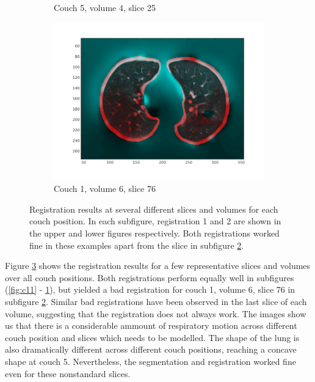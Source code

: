 \documentclass[11pt,a4paper,oneside]{report}
\begin{document}
\begin{figure}
\begin{subfigure}[b]{0.3\textwidth}
	  \caption{Couch 5, volume 4, slice 25}
	  \label{fig:c22}
  \end{subfigure}
  \begin{subfigure}[b]{0.3\textwidth}
	  \includegraphics[width=\textwidth, trim=20 20 20 20]{figures/reg2/reg1_6_76.png}
	  \caption{Couch 1, volume 6, slice 76}
	  \label{fig:c23}
  \end{subfigure}
  \caption{Registration results at several different slices and volumes for each couch position. In each subfigure, registration 1 and 2 are shown in the upper and lower figures respectively. Both registrations worked fine in these examples apart from the slice in subfigure \ref{fig:c23}.}
  \label{fig:c1vis}
\end{figure}


Figure \ref{fig:c1vis} shows the registration results for a few representative slices and volumes over all couch positions. Both registrations perform equally well in subfigures (\ref{fig:c11} - \ref{fig:c22}), but yielded a bad registration for couch 1, volume 6, slice 76 in subfigure \ref{fig:c23}. Similar bad registrations have been observed in the last slice of each volume, suggesting that the registration does not always work. The images show us that there is a considerable ammount of respiratory motion across different couch position and slices which needs to be modelled. The shape of the lung is also dramatically different across different couch positions, reaching a concave shape at couch 5. Nevertheless, the segmentation and registration worked fine even for these nonstandard slices.
\end{document}
